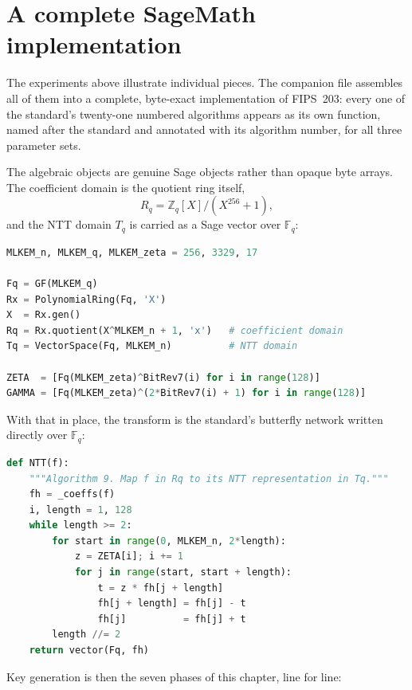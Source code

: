 \section{A complete SageMath implementation}
\label{sec:fips203-impl}

The experiments above illustrate individual pieces. The companion file
 assembles all of them into a complete,
byte-exact implementation of FIPS~203: every one of the standard's
twenty-one numbered algorithms appears as its own function, named after the
standard and annotated with its algorithm number, for all three parameter
sets.


The algebraic objects are genuine Sage objects rather than opaque byte
arrays. The coefficient domain is the quotient ring itself,
\[
R_q = \mathbb{Z}_q[X]/(X^{256}+1),
\]
and the NTT domain $T_q$ is carried as a Sage vector over $\mathbb{F}_q$:

\begin{lstlisting}[language=Python]
MLKEM_n, MLKEM_q, MLKEM_zeta = 256, 3329, 17

Fq = GF(MLKEM_q)
Rx = PolynomialRing(Fq, 'X')
X  = Rx.gen()
Rq = Rx.quotient(X^MLKEM_n + 1, 'x')   # coefficient domain
Tq = VectorSpace(Fq, MLKEM_n)          # NTT domain

ZETA  = [Fq(MLKEM_zeta)^BitRev7(i) for i in range(128)]
GAMMA = [Fq(MLKEM_zeta)^(2*BitRev7(i) + 1) for i in range(128)]
\end{lstlisting}

With that in place, the transform is the standard's butterfly network written
directly over $\mathbb{F}_q$:

\begin{lstlisting}[language=Python]
def NTT(f):
    """Algorithm 9. Map f in Rq to its NTT representation in Tq."""
    fh = _coeffs(f)
    i, length = 1, 128
    while length >= 2:
        for start in range(0, MLKEM_n, 2*length):
            z = ZETA[i]; i += 1
            for j in range(start, start + length):
                t = z * fh[j + length]
                fh[j + length] = fh[j] - t
                fh[j]          = fh[j] + t
        length //= 2
    return vector(Fq, fh)
\end{lstlisting}

Key generation is then the seven phases of this chapter, line for line:

